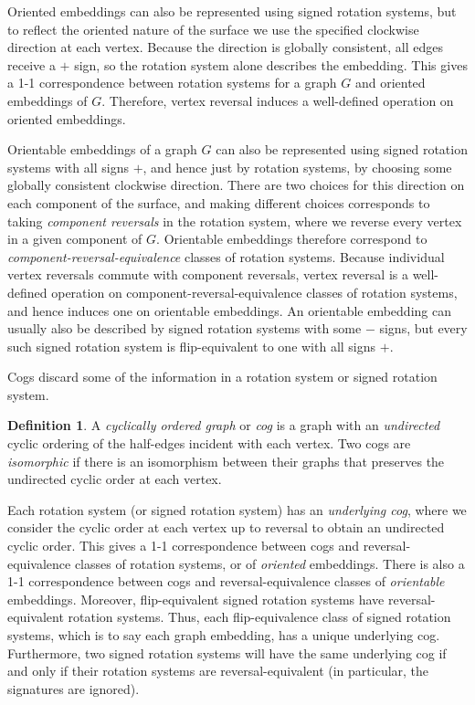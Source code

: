 \documentclass{amsart}
\theoremstyle{definition}
\newtheorem{definition}[theorem]{Definition}
\theoremstyle{remark}
\numberwithin{equation}{section}
\begin{document}
Oriented embeddings can also be represented using signed rotation systems, but to reflect the oriented nature of the surface we  use the specified clockwise direction at each vertex.  Because the direction is globally consistent, all edges receive a $+$ sign, so the rotation system alone describes the embedding.  
This gives a 1-1 correspondence between rotation systems for a graph $G$ and oriented embeddings of $G$.  Therefore, vertex reversal induces a well-defined operation on oriented embeddings.

Orientable embeddings of a graph $G$ can also be represented using signed rotation systems with all signs $+$, and hence just by rotation systems, by choosing some globally consistent clockwise direction.  There are two choices for this direction on each component of the surface, and making different choices corresponds to taking \emph{component reversals} in the rotation system, where we reverse every vertex in a given component of $G$.  Orientable embeddings therefore correspond to \emph{component-reversal-equivalence} classes of rotation systems.
Because individual vertex reversals commute with component reversals, vertex reversal is a well-defined operation on component-reversal-equivalence classes of rotation systems, and hence induces one on orientable embeddings.
An orientable embedding can usually also be described by signed rotation systems with some $-$ signs, but every such signed rotation system is flip-equivalent to one with all signs $+$.

\medskip

Cogs discard some of the information in a rotation system or signed rotation system. 
\begin{definition}
A \emph{cyclically ordered graph} or \emph{cog} is a graph with an \emph{undirected} cyclic ordering of the half-edges incident with each vertex.
Two cogs are \emph{isomorphic} if there is an isomorphism between their graphs that preserves the undirected cyclic order at each vertex.
\end{definition}

Each rotation system (or signed rotation system) has an \emph{underlying cog}, where we consider the cyclic order at each vertex up to reversal to obtain an undirected cyclic order.
This gives a 1-1 correspondence between cogs and reversal-equivalence classes of rotation systems, or of \emph{oriented} embeddings.
There is also a 1-1 correspondence between cogs and reversal-equivalence classes of \emph{orientable} embeddings.
Moreover, flip-equivalent signed rotation systems have reversal-equivalent rotation systems.  Thus, each flip-equivalence class of signed rotation systems, which is to say each graph embedding, has a unique underlying cog.
Furthermore, two signed rotation systems will have the same underlying cog if and only if their rotation systems are reversal-equivalent (in particular, the signatures are ignored).
\end{document}
